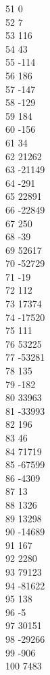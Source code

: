 { 51	0 \\
 52	7 \\
 53	116 \\
 54	43 \\
 55	-114 \\
 56	186 \\
 57	-147 \\
 58	-129 \\
 59	184 \\
 60	-156 \\
 61	34 \\
 62	21262 \\
 63	-21149 \\
 64	-291 \\
 65	22891 \\
 66	-22849 \\
 67	250 \\
 68	-39 \\
 69	52617 \\
 70	-52729 \\
 71	-19 \\
 72	112 \\
 73	17374 \\
 74	-17520 \\
 75	111 \\
 76	53225 \\
 77	-53281 \\
 78	135 \\
 79	-182 \\
 80	33963 \\
 81	-33993 \\
 82	196 \\
 83	46 \\
 84	71719 \\
 85	-67599 \\
 86	-4309 \\
 87	13 \\
 88	1326 \\
 89	13298 \\
 90	-14689 \\
 91	167 \\
 92	2280 \\
 93	79123 \\
 94	-81622 \\
 95	138 \\
 96	-5 \\
 97	30151 \\
 98	-29266 \\
 99	-906 \\
 100	7483 \\
}
